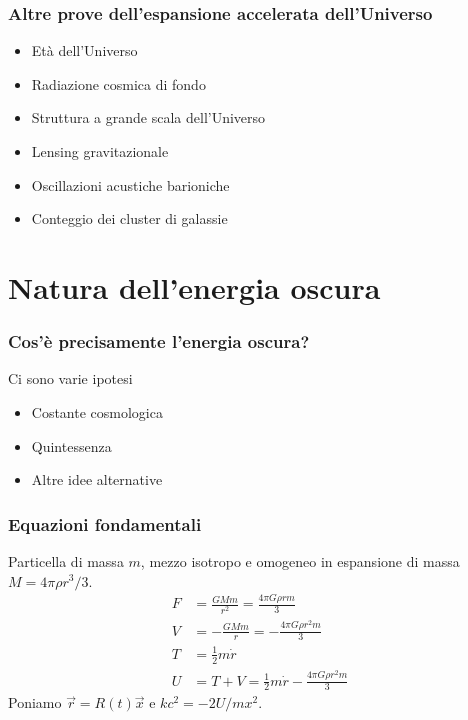 \begin{frame}
  \frametitle{Altre prove dell'espansione accelerata dell'Universo}
  \begin{itemize}
  \item Età dell'Universo
  \item Radiazione cosmica di fondo
  \item Struttura a grande scala dell'Universo
  \item Lensing gravitazionale
  \item Oscillazioni acustiche barioniche
  \item Conteggio dei cluster di galassie
  \end{itemize}
\end{frame}

\section[Natura]{Natura dell'energia oscura}

\begin{frame}
  \frametitle{Cos'è precisamente l'energia oscura?}
  Ci sono varie ipotesi
  \begin{itemize}
  \item Costante cosmologica
  \item Quintessenza
  \item Altre idee alternative
  \end{itemize}
\end{frame}

\begin{frame}
  \frametitle[]{Equazioni fondamentali}
  Particella di massa $m$, mezzo \alert{isotropo e omogeneo} in espansione di
  massa $M = 4\pi\rho r^3/3$.
  \begin{align*}
    F &= \frac{GMm}{r^2} = \frac{4\pi G \rho r m}{3} \\
    V &= -\frac{GMm}{r} = -\frac{4\pi G \rho r^2 m}{3} \\
    T &= \frac{1}{2}m\dot{r} \\
    U &= T + V = \frac{1}{2}m\dot{r} - \frac{4\pi G \rho r^2 m}{3}
  \end{align*}
  Poniamo $\vec{r} = R(t)\vec{x}$ e $kc^2 = -2U/mx^2$.
\end{frame}

